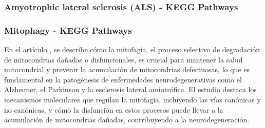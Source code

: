\subsubsection{Amyotrophic lateral sclerosis (ALS) - KEGG Pathways}

\subsubsection{Mitophagy - KEGG Pathways}

En el artículo \cite{Zhang2022}, se describe cómo la mitofagia, el proceso selectivo de degradación de mitocondrias dañadas o disfuncionales, es crucial para mantener la salud mitocondrial y prevenir la acumulación de mitocondrias defectuosas, lo que es fundamental en la patogénesis de enfermedades neurodegenerativas como el Alzheimer, el Parkinson y la esclerosis lateral amiotrófica. El estudio destaca los mecanismos moleculares que regulan la mitofagia, incluyendo las vías canónicas y no canónicas, y cómo la disfunción en estos procesos puede llevar a la acumulación de mitocondrias dañadas, contribuyendo a la neurodegeneración.